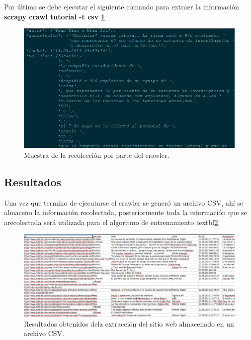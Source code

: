 Por último se debe ejecutar el siguiente comando para extraer la información \textbf{scrapy crawl tutorial -t csv} \textbf{\ref{fig:ocho}}

\begin{figure}[H]
  \centering
  \includegraphics[scale=.35]{imagenes/Capitulo5/8}
  \caption{Muestra de la recolección por parte del crawler.}
  \label{fig:ocho}
\end{figure}

\subsection{Resultados}
Una vez que termino de ejecutarse el crawler se generó un archivo CSV, ahí se almaceno la información recolectada, posteriormente toda la información 
que se arecolectada será utilizada para el algoritmo de entrenamiento textbf{\ref{fig:nueve}}.

\begin{figure}[H]
  \centering
  \includegraphics[scale=.35]{imagenes/Capitulo5/9}
  \caption{Resultados obtenidos dela extracción del sitio web almacenado en un archivo CSV.}
  \label{fig:nueve}
\end{figure}


